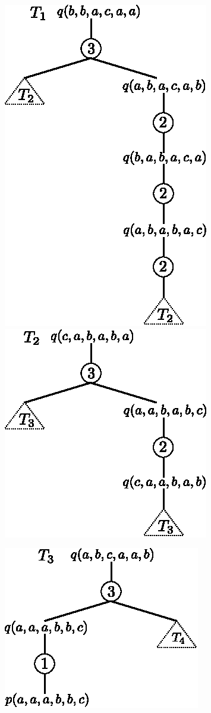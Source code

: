 \documentclass[12pt,a4paper]{amsart}
\begin{document}
\begin{aufgabe1}
\begin{center}
\includegraphics[]{t1.eps} 
\includegraphics[]{t2.eps}
\end{center}
\begin{center}
\includegraphics[]{t3.eps}

\end{center}
\end{aufgabe1}
\end{document}
